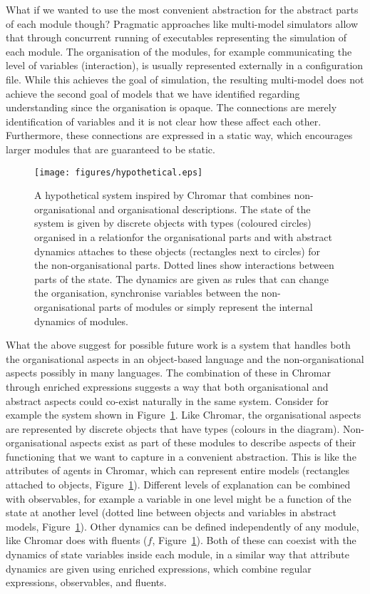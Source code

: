 What if we wanted to use the most convenient abstraction for the abstract parts
of each module though? Pragmatic approaches like multi-model simulators
\citep{erbm_mois_2015, cis_2018} allow that through concurrent running of
executables representing the simulation of each module. The organisation of the
modules, for example communicating the level of variables (interaction), is
usually represented externally in a configuration file. While this achieves the
goal of simulation, the resulting multi-model does not achieve the second goal
of models that we have identified regarding understanding since the organisation
is opaque. The connections are merely identification of variables and it is not
clear how these affect each other. Furthermore, these connections are expressed
in a static way, which encourages larger modules that are guaranteed to be
static.

\begin{figure}[tb]
  \centering
  \texttt{[image: figures/hypothetical.eps]}
  \caption{A hypothetical system inspired by Chromar that combines
    non-organisational and organisational descriptions. The state of the system
    is given by discrete objects with types (coloured circles) organised in a relationfor the
    organisational parts and with abstract dynamics attaches to these objects
    (rectangles next to circles) for the non-organisational parts. Dotted lines
    show interactions between parts of the state. The dynamics are given as
    rules that can change the organisation, synchronise variables between the
    non-organisational parts of modules or simply represent the internal
    dynamics of modules.}
    \label{fig:hyp}
\end{figure}

What the above suggest for possible future work is a system that handles both
the organisational aspects in an object-based language and the
non-organisational aspects possibly in many languages. The combination of these
in Chromar through enriched expressions suggests a way that both organisational
and abstract aspects could co-exist naturally in the same system. Consider for
example the system shown in Figure~\ref{fig:hyp}. Like Chromar, the
organisational aspects are represented by discrete objects that have types
(colours in the diagram). Non-organisational aspects exist as part of these
modules to describe aspects of their functioning that we want to capture in a
convenient abstraction. This is like the attributes of agents in Chromar, which
can represent entire models (rectangles attached to objects,
Figure~\ref{fig:hyp}). Different levels of explanation can be combined with
observables, for example a variable in one level might be a function of the
state at another level (dotted line between objects and variables in abstract
models, Figure~\ref{fig:hyp}). Other dynamics can be defined independently of
any module, like Chromar does with fluents ($f$, Figure~\ref{fig:hyp}). Both of
these can coexist with the dynamics of state variables inside each module, in a
similar way that attribute dynamics are given using enriched expressions, which
combine regular expressions, observables, and fluents.

